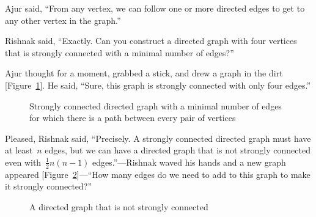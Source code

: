 Ajur said, ``From any vertex, we can follow one or more directed edges to get to any other vertex in the graph.''

Rishnak said, ``Exactly. Can you construct a directed graph with four vertices that is strongly connected with a minimal number of edges?''

Ajur thought for a moment, grabbed a stick, and drew a graph in the dirt [Figure~\ref{15g2}]. He said, ``Sure, this graph is strongly connected with only four edges.''

\begin{figure}
\begin{center}
\caption{Strongly connected directed graph with a minimal number of edges for which there is a path between every pair of vertices}\label{15g2}
\end{center}
\end{figure}

Pleased, Rishnak said, ``Precisely. A strongly connected directed graph must have at least~$n$ edges, but we can have a directed graph that is not strongly connected even with~$\frac{1}{2}n(n-1)$ edges.''---Rishnak waved his hands and a new graph appeared [Figure~\ref{15g3}]---``How many edges do we need to add to this graph to make it strongly connected?''

\begin{figure}
\begin{center}
\caption{A directed graph that is not strongly connected}\label{15g3}
\end{center}
\end{figure}

